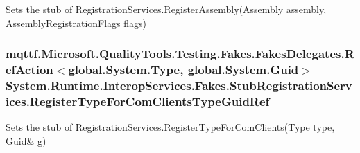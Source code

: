 Sets the stub of Registration\-Services.\-Register\-Assembly(\-Assembly assembly, Assembly\-Registration\-Flags flags)

\hypertarget{class_system_1_1_runtime_1_1_interop_services_1_1_fakes_1_1_stub_registration_services_ab8e8471caa4cee0480ed103faf8794d9}{
\subsubsection[{Register\-Type\-For\-Com\-Clients\-Type\-Guid\-Ref}]{\setlength{\rightskip}{0pt plus 5cm}mqttf.\-Microsoft.\-Quality\-Tools.\-Testing.\-Fakes.\-Fakes\-Delegates.\-Ref\-Action$<$global.\-System.\-Type, global.\-System.\-Guid$>$ System.\-Runtime.\-Interop\-Services.\-Fakes.\-Stub\-Registration\-Services.\-Register\-Type\-For\-Com\-Clients\-Type\-Guid\-Ref}}\label{class_system_1_1_runtime_1_1_interop_services_1_1_fakes_1_1_stub_registration_services_ab8e8471caa4cee0480ed103faf8794d9}


Sets the stub of Registration\-Services.\-Register\-Type\-For\-Com\-Clients(Type type, Guid\& g)

